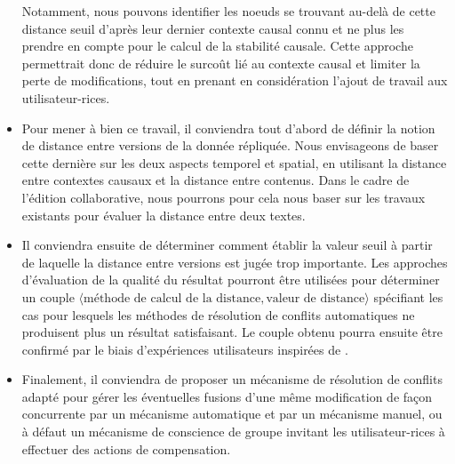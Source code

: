 \begin{itemize}
        Notamment, nous pouvons identifier les noeuds se trouvant au-delà de cette distance seuil d'après leur dernier contexte causal connu et ne plus les prendre en compte pour le calcul de la stabilité causale.
        Cette approche permettrait donc de réduire le surcoût lié au contexte causal et limiter la perte de modifications, tout en prenant en considération l'ajout de travail aux utilisateur-rices.
    \item Pour mener à bien ce travail, il conviendra tout d'abord de définir la notion de distance entre versions de la donnée répliquée.
        Nous envisageons de baser cette dernière sur les deux aspects temporel et spatial, \ie en utilisant la distance entre contextes causaux et la distance entre contenus.
        Dans le cadre de l'édition collaborative, nous pourrons pour cela nous baser sur les travaux existants pour évaluer la distance entre deux textes.
    \item Il conviendra ensuite de déterminer comment établir la valeur seuil à partir de laquelle la distance entre versions est jugée trop importante.
        Les approches d'évaluation de la qualité du résultat pourront être utilisées pour déterminer un couple $\langle \text{méthode de calcul de la distance}, \text{valeur de distance} \rangle$ spécifiant les cas pour lesquels les méthodes de résolution de conflits automatiques ne produisent plus un résultat satisfaisant.
        Le couple obtenu pourra ensuite être confirmé par le biais d'expériences utilisateurs inspirées de \cite{2014-effect-delay-collaborative-editing-ignat,2015-cope-delay-collaborative-note-taking-ignat}.
    \item Finalement, il conviendra de proposer un mécanisme de résolution de conflits adapté pour gérer les éventuelles fusions d'une même modification de façon concurrente par un mécanisme automatique et par un mécanisme manuel, ou à défaut un mécanisme de conscience de groupe invitant les utilisateur-rices à effectuer des actions de compensation.
\end{itemize}
